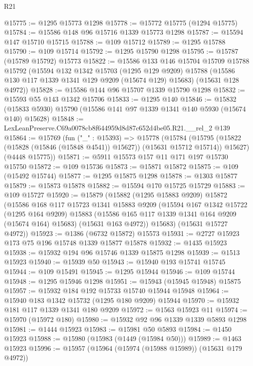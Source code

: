 \begin{lexlean}{R21}
\begin{coremodule}
@15775 := @1295 @15773 @1298
@15778 := @15772 @15775 (@1294 @15775)
@15784 := @15586 @148 @96 @15716 @1339 @15773 @1298
@15787 := @15594 @147 @15710 @15715
@15788 := @109 @15712
@15789 := @1295 @15788
@15790 := @109 @15714
@15792 := @1295 @15790 @1298
@15795 := @15787 (@15789 @15792) @15773
@15822 := @15586
    @133
    @146
    @15704
    @15709
    @15788
    @15792
    (@15594
      @132
      @1342
      @15703
      (@1295 @129 @9209)
      @15788
      (@15586 @130 @117 @1339 @1341 @129 @9209 (@15674 @129) @15683)
      (@15631 @128 @4972))
@15828 := @15586 @144 @96 @15707 @1339 @15790 @1298
@15832 := @15593 @55 @143 @1342 @15706
@15833 := @1295 @140
@15846 := @15832 (@15833 @5930) @15790 (@15586 @141 @97 @1339 @1341 @140 @5930 (@15674 @140) @15628)
@15848 := LexLeanPreserve.C69a0078cb8f644959d8d87c652d4be05.R21.__rel_2 @139
@15864 := @15769
    (fun ("_" : @15393) =>
    @15778
      (@15784
        (@15795 (@15822 (@15828 (@15846 (@15848 @4541)) @15627)) (@15631 @15712 @15714))
        @15627)
      (@4448 @15775))
@15871 := @5911 @15573 @157 @11 @171 @197 @15730 @15750
@15872 := @109 @15736
@15873 := @15871 @15872
@15875 := @109 (@15492 @15744)
@15877 := @1295 @15875 @1298
@15878 := @1303 @15877
@15879 := @15873 @15878
@15882 := @15594 @170 @15725 @15729
@15883 := @109 @15727
@15920 := @15879
    (@15882
      (@1295 @15883 @9209)
      @15872
      (@15586
        @168
        @117
        @15723
        @1341
        @15883
        @9209
        (@15594
          @167
          @1342
          @15722
          (@1295 @164 @9209)
          @15883
          (@15586 @165 @117 @1339 @1341 @164 @9209 (@15674 @164) @15683)
          (@15631 @163 @4972))
        @15683)
      (@15631 @15727 @4972))
@15923 := @1386 (@6732 @15872) @15573
@15931 := @2727 @15923 @173 @75 @196 @15748 @1339 @15877 @15878
@15932 := @1435 @15923
@15938 := @15932 @194 @96 @15746 @1339 @15875 @1298
@15939 := @1513 @15923
@15940 := @15939 @50
@15943 := @15940 @193 @15741 @15745
@15944 := @109 @15491
@15945 := @1295 @15944
@15946 := @109 @15744
@15948 := @1295 @15946 @1298
@15951 := @15943 (@15945 @15948) @15875
@15957 := @15932 @184 @192 @15733 @15740 @15944 @15948
@15964 := @15940 @183 @1342 @15732 (@1295 @180 @9209) @15944
@15970 := @15932 @181 @117 @1339 @1341 @180 @9209
@15972 := @1563 @15923 @11
@15974 := @15970 (@15972 @180)
@15980 := @15932 @92 @96 @1339 @1339 @5893 @1298
@15981 := @1444 @15923
@15983 := @15981 @50 @5893
@15984 := @1450 @15923
@15988 := @15980 (@15983 (@1449 (@15984 @50)))
@15989 := @1463 @15923
@15996 := @15957 (@15964 (@15974 (@15988 @15989)) (@15631 @179 @4972))

\end{coremodule}
\end{lexlean}
